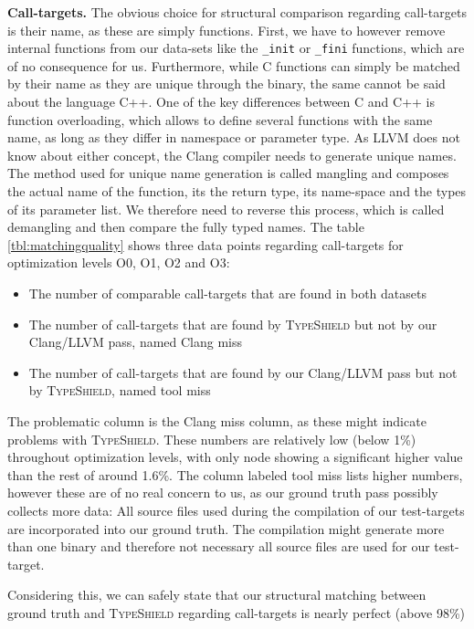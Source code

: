 \textbf{Call-targets.} The obvious choice for structural comparison regarding call-targets is their name, as these are simply functions. 
First, we have to however remove internal functions from our data-sets like the \texttt{\_init} or \texttt{\_fini} functions, which are of no consequence for us. 
Furthermore, while C functions can simply be matched by their name as they are unique through the binary, the same cannot be said about the 
language C++. One of the key differences between C and C++ is function overloading, which allows to define several functions with the same name, as 
long as they differ in namespace or parameter type. As LLVM does not know about either concept, the Clang compiler needs to generate unique names. 
The method used for unique name generation is called mangling and composes the actual name of the function, its the return type, its name-space and the 
types of its parameter list. We therefore need to reverse this process, which is called demangling and then compare the fully typed names.
The table \ref{tbl:matchingquality} shows three data points regarding call-targets for optimization levels O0, O1, O2 and O3:
\begin{itemize}
\item The number of comparable call-targets that are found in both datasets
\item The number of call-targets that are found by \textsc{TypeShield} but not by our Clang/LLVM pass, named Clang miss
\item The number of call-targets that are found by our Clang/LLVM pass but not by \textsc{TypeShield}, named tool miss
\end{itemize}
The problematic column is the Clang miss column, as these might indicate problems with \textsc{TypeShield}. These numbers are relatively low (below 1\%) 
throughout optimization levels, with only node showing a significant higher value than the rest of around 1.6\%. The column labeled tool miss lists 
higher numbers, however these are of no real concern to us, as our ground truth pass possibly collects more data: All source files used during the 
compilation of our test-targets are incorporated into our ground truth. The compilation might generate more than one binary and therefore not 
necessary all source files are used for our test-target.

Considering this, we can safely state that our structural matching between ground truth and \textsc{TypeShield} regarding call-targets is nearly
perfect (above 98\%)

